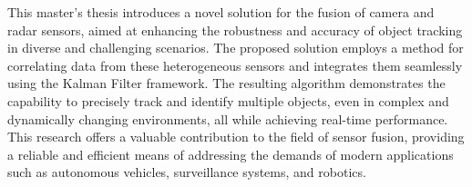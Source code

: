 
\begin{enAbstract}

    This master's thesis introduces a novel solution for the fusion of camera and radar sensors, 
    aimed at enhancing the robustness and accuracy of object tracking in diverse and challenging scenarios. 
    The proposed solution employs a method for correlating data from these heterogeneous sensors 
    and integrates them seamlessly using the Kalman Filter framework. 
    The resulting algorithm demonstrates the capability to precisely track and identify multiple objects, 
    even in complex and dynamically changing environments, all while achieving real-time performance. 
    This research offers a valuable contribution to the field of sensor fusion, providing a reliable 
    and efficient means of addressing the demands of modern applications such as autonomous vehicles, surveillance systems, and robotics.
    

    \enAbsKeywords
\end{enAbstract}
